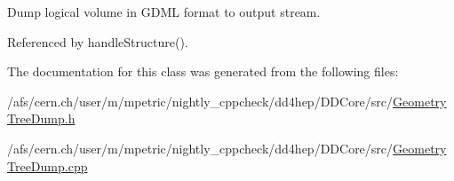 Dump logical volume in GDML format to output stream. 

Referenced by handleStructure().

The documentation for this class was generated from the following files:\begin{DoxyCompactItemize}
\item 
/afs/cern.ch/user/m/mpetric/nightly\_\-cppcheck/dd4hep/DDCore/src/\hyperlink{_geometry_tree_dump_8h}{GeometryTreeDump.h}\item 
/afs/cern.ch/user/m/mpetric/nightly\_\-cppcheck/dd4hep/DDCore/src/\hyperlink{_geometry_tree_dump_8cpp}{GeometryTreeDump.cpp}\end{DoxyCompactItemize}
